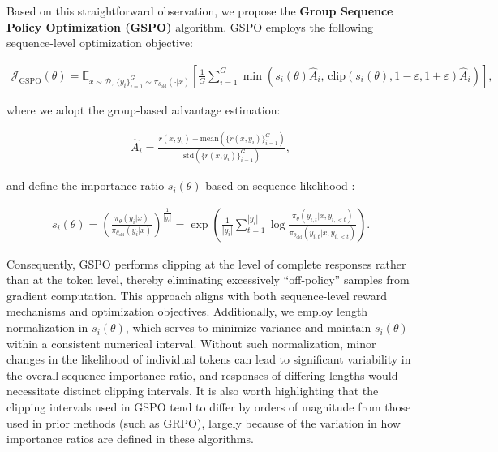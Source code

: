 Based on this straightforward observation, we propose the \textbf{Group Sequence Policy Optimization (GSPO)} algorithm. GSPO employs the following sequence-level optimization objective:

\begin{align}
\mathcal{J}_\text{GSPO} (\theta) =
\mathbb{E}_{ x \sim \mathcal{D},\, \{y_i\}_{i=1}^G \sim \pi_{\theta_\text{old}}( \cdot | x) }
\left[ 
\frac{1}{G} \sum_{i=1}^{G}
\min \left( s_{i}(\theta)  \widehat{A}_{i},  \, \mathrm{clip} \left( s_{i}(\theta), 1 - {\varepsilon}, 1 + {\varepsilon} \right) \widehat{A}_{i} \right) 
\right],
\label{equ:gspo}
\end{align}

where we adopt the group-based advantage estimation:

\begin{align}
\widehat{A}_{i} = \frac{r(x, y_i) - \mathrm{mean} \left( \{ r(x, y_i) \}_{i=1}^G \right) }{ \mathrm{std} \left( \{ r(x, y_i) \}_{i=1}^G \right) },
\end{align}

and define the importance ratio $s_{i}(\theta)$ based on sequence likelihood \citep{click}:

\begin{align}
s_{i}(\theta) = \left( \frac{ \pi_{\theta} (y_i | x) }{ \pi_{\theta_\text{old}} (y_i | x)} \right)^{\frac{1}{|y_i|}}
=
\exp \left( \frac{1}{|y_i|} \sum_{t=1}^{|y_i|} \log \frac{ \pi_{\theta} (y_{i,t} | x, y_{i,<t}) }{ \pi_{\theta_\text{old}} (y_{i,t} | x,y_{i,<t})} \right).
\end{align}

Consequently, GSPO performs clipping at the level of complete responses rather than at the token level, thereby eliminating excessively “off-policy” samples from gradient computation. This approach aligns with both sequence-level reward mechanisms and optimization objectives. Additionally, we employ length normalization in $s_{i}(\theta)$, which serves to minimize variance and maintain $s_{i}(\theta)$ within a consistent numerical interval. Without such normalization, minor changes in the likelihood of individual tokens can lead to significant variability in the overall sequence importance ratio, and responses of differing lengths would necessitate distinct clipping intervals. It is also worth highlighting that the clipping intervals used in GSPO tend to differ by orders of magnitude from those used in prior methods (such as GRPO), largely because of the variation in how importance ratios are defined in these algorithms.

